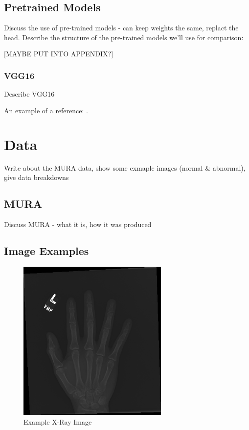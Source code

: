 \documentclass[11pt]{article} %
\theoremstyle{plain}
\theoremstyle{definition}
\begin{document}
\subsection{Pretrained Models}
Discuss the use of pre-trained models - can keep weights the same, replact the head.
Describe the structure of the pre-trained models we'll use for comparison:

[MAYBE PUT INTO APPENDIX?] 
\subsubsection{VGG16}
Describe VGG16

An example of a reference:
\cite{hastie/etal:2009}.



\newpage
\section{Data}
Write about the MURA data, show some exmaple images (normal & abnormal), give data breakdowns 

\subsection{MURA}
Discuss MURA - what it is, how it was produced


\subsection{Image Examples}

\begin{figure}[!ht]
  \caption{Example X-Ray Image}
  \label{fig:xray1}
  \includegraphics[width=\textwidth, height=8cm]{image1}
  \centering
\end{figure}
\end{document}
